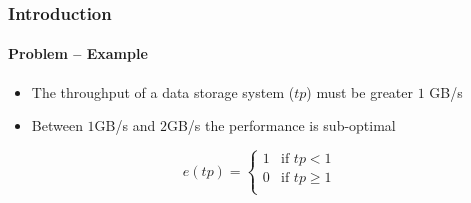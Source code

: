\begin{frame}
  \frametitle{Introduction}
  \framesubtitle{Problem -- Example}
  \begin{itemize}
  \item[\bulletgood] The throughput of a data storage system ($tp$) must be greater $1$ GB/s
  \item[\bulletbad] Between $1$GB/s and $2$GB/s the performance is sub-optimal
  \end{itemize}
  \vspace{1cm}
  $$
  e(tp) =
  \begin{cases}
    1 & \textrm{if~} tp < 1 \\
    0 & \textrm{if~}  tp \geq 1\\
  \end{cases}
  $$
\end{frame}
